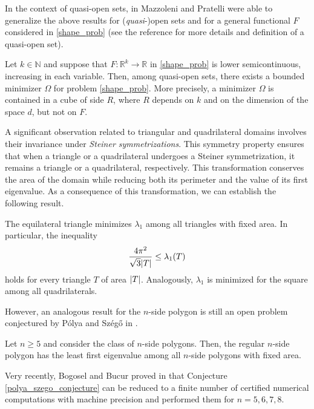 In the context of quasi-open sets, in \cite{mazzoleni2013existence} Mazzoleni and Pratelli were able to generalize the above results for (\textit{quasi}-)open sets and for a general functional \(F\) considered in \eqref{shape_prob} (see the reference for more details and definition of a quasi-open set).
\begin{theorem}
    Let \(k \in \mathbb{N}\) and suppose that \(F:\mathbb{R}^k \rightarrow \mathbb{R}\) in \eqref{shape_prob} is lower semicontinuous, increasing in each variable. Then, among quasi-open sets, there exists a bounded minimizer \(\Omega\) for problem \eqref{shape_prob}. More precisely, a minimizer \(\Omega\) is contained in a cube of side \(R\), where \(R\) depends on \(k\) and on the dimension of the space \(d\), but not on \(F\).
\end{theorem}

A significant observation related to triangular and quadrilateral domains involves their invariance under \textit{Steiner symmetrizations}. This symmetry property ensures that when a triangle or a quadrilateral undergoes a Steiner symmetrization, it remains a triangle or a quadrilateral, respectively. This transformation conserves the area of the domain while reducing both its perimeter and the value of its first eigenvalue. As a consequence of this transformation, we can establish the following result.

\begin{theorem}
    The equilateral triangle minimizes \(\lambda_1\) among all triangles with fixed area. In particular, the inequality
    \[
    \frac{4 \pi^2}{\sqrt{3}\abs{T}} \leq  \lambda_1(T) 
    \]
    holds for every triangle \(T\) of area \(\abs{T}\). Analogously, \(\lambda_1\) is minimized for the square among all quadrilaterals.
\end{theorem}

However, an analogous result for the \(n\)-side polygon is still an open problem conjectured by Pólya and Szég\H{o} in \cite{polya1951isoperimetric}.
\begin{conjecture}\label{polya_szego_conjecture}
    Let \(n \geq 5\) and consider the class of \(n\)-side polygons. Then, the regular \(n\)-side polygon has the least first eigenvalue among all \(n\)-side polygons with fixed area.
\end{conjecture}

Very recently, Bogosel and Bucur proved in \cite{bogosel2022polygonal} that Conjecture \eqref{polya_szego_conjecture} can be reduced to a finite number of certified numerical computations with machine precision and performed them for \(n=5, 6, 7, 8\).

